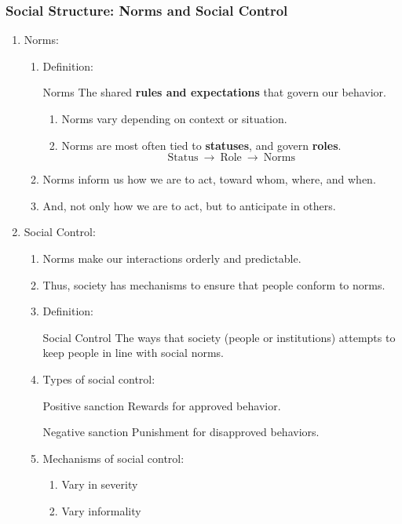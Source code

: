 \documentclass[12pt,a4paper]{article}
\begin{document}
\subsubsection{Social Structure: Norms and Social Control}
\begin{enumerate}
	\item Norms: 
	\begin{enumerate}
		\item Definition: 
		\begin{df}{Norms}
			The shared \textbf{rules and expectations} that govern our behavior.
		\end{df}
		\begin{enumerate}
			\item Norms vary depending on context or situation.
			\item Norms are most often tied to \textbf{statuses}, and govern \textbf{roles}.
			$$\text{Status}\ \longrightarrow\ \text{Role}\ \longrightarrow\ \text{Norms}$$
		\end{enumerate}
		\item Norms inform us how we are to act, toward whom, where, and when. 
		\item And, not only how we are to act, but to anticipate in others. 
	\end{enumerate}
	\item Social Control: 
	\begin{enumerate}
		\item Norms make our interactions orderly and predictable. 
		\item Thus, society has mechanisms to ensure that people conform to norms. 
		\item Definition: 
		\begin{df}{Social Control}
			The ways that society (people or institutions) attempts to keep people in line with social norms. 
		\end{df}
		\item Types of social control: 
		\begin{df}{Positive sanction}
			Rewards for approved behavior. 
		\end{df}
		\begin{df}{Negative sanction}
			Punishment for disapproved behaviors.
		\end{df}
		\item Mechanisms of social control: 
		\begin{enumerate}
			\item Vary in severity
			\item Vary informality

\end{enumerate}
\end{enumerate}
\end{enumerate}
\end{document}
